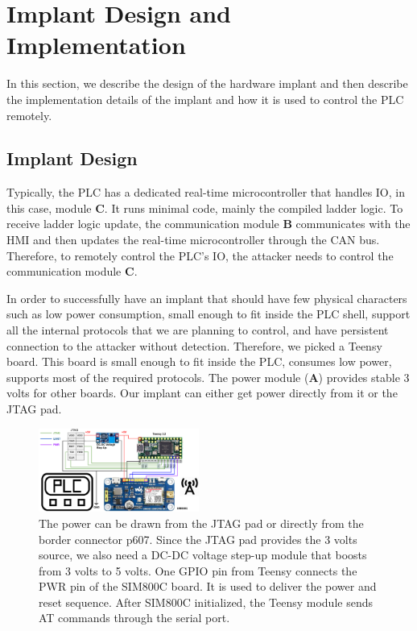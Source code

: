 \section{Implant Design and Implementation}
\label{sec:implant-implementation}

In this section, we describe the design of the hardware implant and then describe the implementation details of the implant and how it is used to control the PLC remotely.

\subsection{Implant Design}

Typically, the PLC has a dedicated real-time microcontroller
that handles IO, in this case, module \textbf{C}. It runs minimal code, mainly the compiled ladder logic.  To receive ladder logic update, the communication module \textbf{B} communicates with the HMI and then updates the real-time microcontroller through the CAN bus. Therefore, to remotely control the PLC's IO, the attacker needs to control the communication module \textbf{C}.


In order to successfully have an implant that should have few physical characters such as low power consumption, small enough to fit inside the PLC shell, support all the internal protocols that we are planning to control, and have persistent connection to the attacker without detection. Therefore, we picked a Teensy board. This board is small enough to fit inside the PLC, consumes low power, supports most of the required protocols. The power module (\textbf{A}) provides stable 3 volts for other boards. Our implant can either get power directly from it or the JTAG pad. 

\begin{figure}[tp!]
	\includegraphics[width=0.47\textwidth]{figures/sim800teensy}
	\centering
	\caption{The power can be drawn from the JTAG pad or directly from the border connector p607. Since the JTAG pad provides the 3 volts source, we also need a DC-DC voltage step-up module that boosts from 3 volts to 5 volts. One GPIO pin from Teensy connects the PWR pin of the SIM800C board. It is used to deliver the power and reset sequence. After SIM800C initialized, the Teensy module sends AT commands through the serial port.}
	\label{fig:sim800teensy}
\end{figure}

